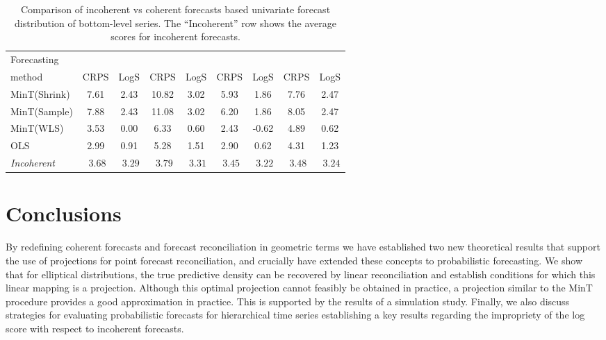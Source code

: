 \documentclass[a4paper, 11pt]{article}
\def\mathbi#1{\textit{ #1}}
\theoremstyle{theo}
\theoremstyle{definition}
\begin{document}
\begin{table}
	\caption{Comparison of incoherent vs coherent forecasts based univariate forecast distribution of bottom-level series. The ``Incoherent'' row shows the average scores for incoherent forecasts.}\label{table:5}
	\centering\tabcolsep=0.08cm\small
	\begin{tabular}{@{}lSSSSSSSS@{}}
		\toprule
		Forecasting &
		 &
		 &
		 &
		 \\
		\cmidrule(lr){2-3} \cmidrule(lr){4-5} \cmidrule(lr){6-7} \cmidrule(l){8-9}
		method       & CRPS   & LogS    & CRPS   & LogS    & CRPS   & LogS    & CRPS   & LogS \\
		\midrule
		MinT(Shrink) &  7.61  &  2.43  &  10.82  &  3.02  &  5.93  &  1.86  &  7.76  & 2.47  \\
		MinT(Sample) &  7.88  &  2.43  &  11.08  &  3.02  &  6.20  &  1.86  &  8.05  & 2.47  \\
		MinT(WLS)    &  3.53  &  0.00  &   6.33  &  0.60  &  2.43  & -0.62  &  4.89  & 0.62  \\
		OLS          &  2.99  &  0.91  &   5.28  &  1.51  &  2.90  &  0.62  &  4.31  & 1.23  \\
		\midrule
		\textit{Incoherent} & $\mathbi{3.68}$ & $\mathbi{3.29}$ & $\mathbi{3.79}$ & $\mathbi{3.31}$ & $\mathbi{3.45}$ & $\mathbi{3.22}$ & $\mathbi{3.48}$ & $\mathbi{3.24}$ \\
		\bottomrule
	\end{tabular}
\end{table}

\section{Conclusions}\label{sec:conclusions}


By redefining coherent forecasts and forecast reconciliation in geometric terms we have established two new theoretical results that support the use of projections for point forecast reconciliation, and crucially have extended these concepts to probabilistic forecasting.  We show that for elliptical distributions, the true predictive density can be recovered by linear reconciliation and establish conditions for which this linear mapping is a projection.  Although this optimal projection cannot feasibly be obtained in practice, a projection similar to the MinT procedure provides a good approximation in practice.  This is supported by the results of a simulation study.  Finally, we also discuss strategies for evaluating probabilistic forecasts for hierarchical time series establishing a key results regarding the impropriety of the log score with respect to incoherent forecasts.
\end{document}
